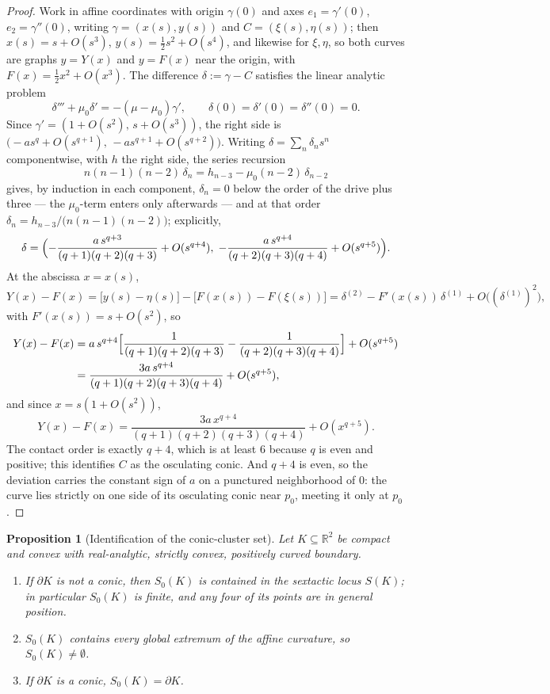 \documentclass[11pt]{amsart}
\newtheorem{proposition}[theorem]{Proposition}
\theoremstyle{definition}
\newcommand{\R}{\mathbb{R}}
\begin{document}
\begin{proof}
Work in affine coordinates with origin $\gamma(0)$ and axes
$e_1=\gamma'(0)$, $e_2=\gamma''(0)$, writing $\gamma=(x(s),y(s))$ and
$C=(\xi(s),\eta(s))$; then $x(s)=s+O(s^3)$, $y(s)=\tfrac12s^2+O(s^4)$, and
likewise for $\xi,\eta$, so both curves are graphs $y=Y(x)$ and $y=F(x)$
near the origin, with $F(x)=\tfrac12x^2+O(x^3)$. The difference
$\delta:=\gamma-C$ satisfies the linear analytic problem
\[
\delta'''+\mu_0\delta'=-(\mu-\mu_0)\gamma',\qquad
\delta(0)=\delta'(0)=\delta''(0)=0 .
\]
Since $\gamma'=(1+O(s^2),\,s+O(s^3))$, the right side is
$\bigl(-as^{q}+O(s^{q+1}),\,-as^{q+1}+O(s^{q+2})\bigr)$. Writing
$\delta=\sum_n\delta_ns^n$ componentwise, with $h$ the right side, the series
recursion
\[
n(n-1)(n-2)\,\delta_n=h_{n-3}-\mu_0(n-2)\,\delta_{n-2}
\]
gives, by induction in each component, $\delta_n=0$ below the order of the
drive plus three --- the $\mu_0$-term enters only afterwards --- and at that
order $\delta_n=h_{n-3}/\bigl(n(n-1)(n-2)\bigr)$; explicitly,
\[
\delta=\Bigl(-\frac{a\,s^{q+3}}{(q+1)(q+2)(q+3)}+O(s^{q+4}),\;
-\frac{a\,s^{q+4}}{(q+2)(q+3)(q+4)}+O(s^{q+5})\Bigr).
\]
At the abscissa $x=x(s)$,
\[
Y(x)-F(x)=\bigl[y(s)-\eta(s)\bigr]-\bigl[F(x(s))-F(\xi(s))\bigr]
=\delta^{(2)}-F'(x(s))\,\delta^{(1)}+O\bigl((\delta^{(1)})^2\bigr),
\]
with $F'(x(s))=s+O(s^2)$, so
\begin{align*}
Y(x)-F(x)
&=a\,s^{q+4}\Bigl[\frac{1}{(q+1)(q+2)(q+3)}
-\frac{1}{(q+2)(q+3)(q+4)}\Bigr]+O(s^{q+5})\\
&=\frac{3a\,s^{q+4}}{(q+1)(q+2)(q+3)(q+4)}+O(s^{q+5}),
\end{align*}
and since $x=s(1+O(s^2))$,
\[
Y(x)-F(x)=\frac{3a\,x^{q+4}}{(q+1)(q+2)(q+3)(q+4)}+O(x^{q+5}).
\]
The contact order is exactly $q+4$, which is at least $6$ because $q$ is even
and positive; this identifies $C$ as the osculating conic. And $q+4$ is even,
so the deviation carries the constant sign of $a$ on a punctured neighborhood
of $0$: the curve lies strictly on one side of its osculating conic near
$p_0$, meeting it only at $p_0$.
\end{proof}

\begin{proposition}[Identification of the conic-cluster set]\label{prop:S0}
Let $K\subseteq\R^2$ be compact and convex with real-analytic, strictly
convex, positively curved boundary.
\begin{enumerate}[label=\textup{(\roman*)}]
\item If $\partial K$ is not a conic, then $S_0(K)$ is contained in the
sextactic locus $S(K)$; in particular $S_0(K)$ is finite, and any four of its
points are in general position.
\item $S_0(K)$ contains every global extremum of the affine curvature, so
$S_0(K)\ne\emptyset$.
\item If $\partial K$ is a conic, $S_0(K)=\partial K$.
\end{enumerate}
\end{proposition}
\end{document}

